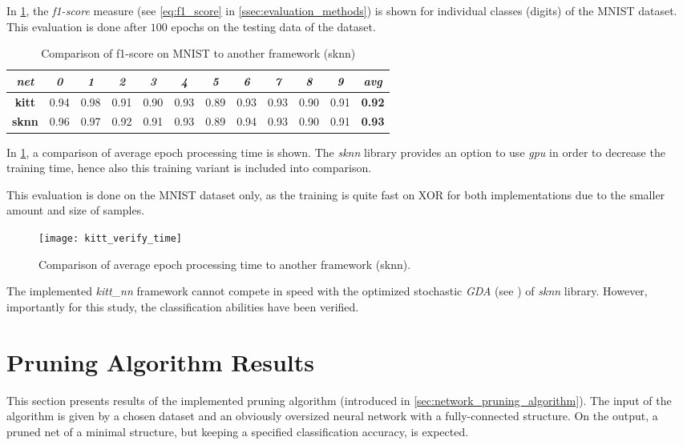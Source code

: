 In \cref{tab:kitt_verify_f1}, the \textit{f1-score} measure (see \cref{eq:f1_score} in \cref{ssec:evaluation_methods}) is shown for individual classes (digits) of the MNIST dataset. This evaluation is done after $ 100 $ epochs on the testing data of the dataset.

\begin{table}[H]
\centering
\caption{Comparison of f1-score on MNIST to another framework (sknn)}
\label{tab:kitt_verify_f1}
\resizebox{\textwidth}{!} {
\begin{tabular}{|c|c|c|c|c|c|c|c|c|c|c|c|}
\hline
\textit{net}  & \textit{0} & \textit{1} & \textit{2} & \textit{3} & \textit{4} & \textit{5} & \textit{6} & \textit{7} & \textit{8} & \textit{9} & \textit{avg}  \\ \hline
\textbf{kitt} & 0.94       & 0.98       & 0.91       & 0.90       & 0.93       & 0.89       & 0.93       & 0.93       & 0.90       & 0.91       & \textbf{0.92} \\ \hline
\textbf{sknn} & 0.96       & 0.97       & 0.92       & 0.91       & 0.93       & 0.89       & 0.94       & 0.93       & 0.90       & 0.91       & \textbf{0.93} \\ \hline
\end{tabular}
}
\end{table}

In \cref{fig:kitt_verify_time}, a comparison of average epoch processing time is shown. The \textit{sknn} library provides an option to use \textit{gpu} in order to decrease the training time, hence also this training variant is included into comparison.

This evaluation is done on the MNIST dataset only, as the training is quite fast on XOR for both implementations due to the smaller amount and size of samples.

\begin{figure}[H]
  \centering
  \texttt{[image: kitt\_verify\_time]}
  \caption{Comparison of average epoch processing time to another framework (sknn).}
  \label{fig:kitt_verify_time}
\end{figure}

The implemented \textit{kitt\_nn} framework cannot compete in speed with the optimized stochastic \textit{GDA} (see \citep{misc:sknn}) of \textit{sknn} library. However, importantly for this study, the classification abilities have been verified.

\section{Pruning Algorithm Results} \label{sec:pruning_algorithm_results}
This section presents results of the implemented pruning algorithm (introduced in \cref{sec:network_pruning_algorithm}). The input of the algorithm is given by a chosen dataset and an obviously oversized neural network with a fully-connected structure. On the output, a pruned net of a minimal structure, but keeping a specified classification accuracy, is expected.

